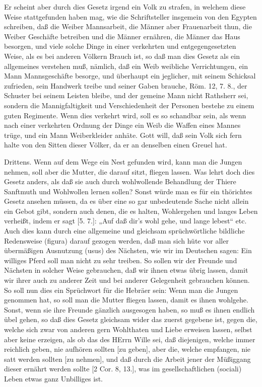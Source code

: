 Er scheint aber durch dies Gesetz irgend ein Volk zu strafen, in welchem diese Weise stattgefunden haben mag, wie die Schriftsteller insgemein von den Egypten schreiben, daß die Weiber Mannsarbeit, die Männer aber Frauenarbeit thun, die Weiber Geschäfte betreiben und die Männer ernähren, die Männer das Haus besorgen, und viele solche Dinge in einer verkehrten und entgegengesetzten Weise, als es bei anderen Völkern Brauch ist, so daß man dies Gesetz als ein allgemeines verstehen muß, nämlich, daß ein Weib weibliche Verrichtungen, ein Mann Mannsgeschäfte besorge, und überhaupt ein jeglicher, mit seinem Schicksal zufrieden, sein Handwerk treibe und seiner Gaben brauche, Röm. 12, 7. 8., der Schuster bei seinem Leisten bleibe, und der gemeine Mann nicht Rathsherr sei, sondern die Mannigfaltigkeit und Verschiedenheit der Personen bestehe zu einem guten Regimente. Wenn dies verkehrt wird, soll es so schandbar sein, als wenn nach einer verkehrten Ordnung der Dinge ein Weib die Waffen eines Mannes trüge, und ein Mann Weiberkleider anhäte. Gott will, daß sein Volk sich fern halte von den Sitten dieser Völker, da er an denselben einen Greuel hat.

Drittens. Wenn auf dem Wege ein Nest gefunden wird, kann man die Jungen nehmen, soll aber die Mutter, die darauf sitzt, fliegen lassen. Was lehrt doch dies Gesetz anders, als daß sie auch durch wohlwollende Behandlung der Thiere Sanftmuth und Wohlwollen lernen sollen? Sonst würde man es für ein thörichtes Gesetz ansehen müssen, da es über eine so gar unbedeutende Sache nicht allein ein Gebot gibt, sondern auch denen, die es halten, Wohlergehen und langes Leben verheißt, indem er sagt [5. 7.]: „Auf daß dir’s wohl gehe, und lange lebest“ etc. Auch dies kann durch eine allgemeine und gleichsam sprüchwörtliche bildliche Redensweise (figura) darauf gezogen werden, daß man sich hüte vor aller übermäßigen Ausnutzung (usus) des Nächsten, wie wir im Deutschen sagen: Ein williges Pferd soll man nicht zu sehr treiben. So sollen wir der Freunde und Nächsten in solcher Weise gebrauchen, daß wir ihnen etwas übrig lassen, damit wir ihrer auch zu anderer Zeit und bei anderer Gelegenheit gebrauchen können. So soll nun dies ein Sprüchwort für die Hebräer sein: Wenn man die Jungen genommen hat, so soll man die Mutter fliegen lassen, damit es ihnen wohlgehe. Sonst, wenn sie ihre Freunde gänzlich ausgesogen haben, so muß es ihnen endlich übel gehen, so daß dies Gesetz gleichsam wider das zuerst gegebene ist, gegen die, welche sich zwar von anderen gern Wohlthaten und Liebe erweisen lassen, selbst aber keine erzeigen, als ob das des HErrn Wille sei, daß diejenigen, welche immer reichlich geben, nie aufhören sollten [zu geben], aber die, welche empfangen, nie satt werden sollten [zu nehmen], und daß durch die Arbeit jener der Müßiggang dieser ernährt werden sollte [2 Cor. 8, 13.], was im gesellschaftlichen (sociali) Leben etwas ganz Unbilliges ist.

